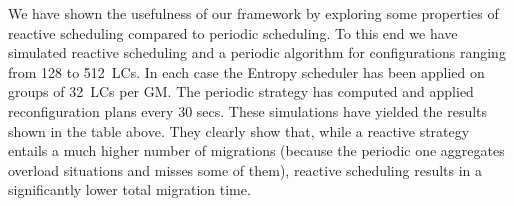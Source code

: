 
We have shown the usefulness of our framework by exploring some
properties of reactive scheduling compared to periodic scheduling. To
this end we have simulated reactive scheduling and a periodic
algorithm for configurations ranging from 128 to 512~LCs. In each case
the Entropy scheduler has been applied on groups of 32~LCs per GM. The
periodic strategy has computed and applied reconfiguration plans every
30 secs. These simulations have yielded the results shown in the table
above. They clearly show that, while a reactive strategy entails a
much higher number of migrations (because the periodic one aggregates
overload situations and misses some of them), reactive scheduling
results in a significantly lower total migration time. 

